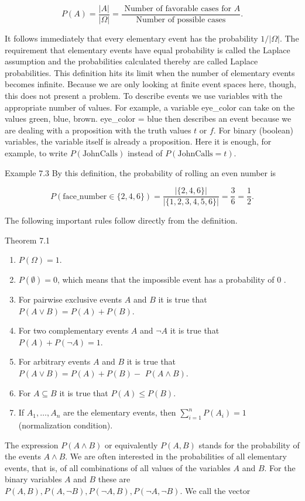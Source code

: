 \documentclass[10pt]{book}
\begin{document}
$$
P(A)=\frac{|A|}{|\Omega|}=\frac{\text { Number of favorable cases for } A}{\text { Number of possible cases }} .
$$

It follows immediately that every elementary event has the probability $1 /|\Omega|$. The requirement that elementary events have equal probability is called the Laplace assumption and the probabilities calculated thereby are called Laplace probabilities. This definition hits its limit when the number of elementary events becomes infinite. Because we are only looking at finite event spaces here, though, this does not present a problem. To describe events we use variables with the appropriate number of values. For example, a variable eye\_color can take on the values green, blue, brown. eye\_color = blue then describes an event because we are dealing with a proposition with the truth values $t$ or $f$. For binary (boolean) variables, the variable itself is already a proposition. Here it is enough, for example, to write $P(\text{JohnCalls})$ instead of $P(\text{JohnCalls}=t)$.

Example 7.3 By this definition, the probability of rolling an even number is

$$
P(\text{face\_number} \in\{2,4,6\})=\frac{|\{2,4,6\}|}{|\{1,2,3,4,5,6\}|}=\frac{3}{6}=\frac{1}{2} .
$$

The following important rules follow directly from the definition.

Theorem 7.1
\begin{enumerate}
  \item $P(\Omega)=1$.
  \item $P(\emptyset)=0$, which means that the impossible event has a probability of 0 .
  \item For pairwise exclusive events $A$ and $B$ it is true that $P(A \vee B)=P(A)+P(B)$.
  \item For two complementary events $A$ and $\neg A$ it is true that $P(A)+P(\neg A)=1$.
  \item For arbitrary events $A$ and $B$ it is true that $P(A \vee B)=P(A)+P(B)-$ $P(A \wedge B)$.
  \item For $A \subseteq B$ it is true that $P(A) \leq P(B)$.
  \item If $A_{1}, \ldots, A_{n}$ are the elementary events, then $\sum_{i=1}^{n} P\left(A_{i}\right)=1$ (normalization condition).
\end{enumerate}

The expression $P(A \wedge B)$ or equivalently $P(A, B)$ stands for the probability of the events $A \wedge B$. We are often interested in the probabilities of all elementary events, that is, of all combinations of all values of the variables $A$ and $B$. For the binary variables $A$ and $B$ these are $P(A, B), P(A, \neg B), P(\neg A, B), P(\neg A, \neg B)$. We call the vector
\end{document}
